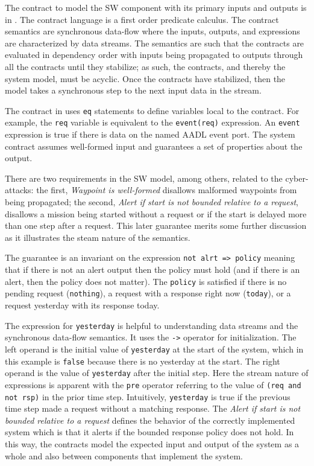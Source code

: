 The contract to model the SW component with its primary inputs and outputs is in . The contract language is a first order predicate calculus. The contract semantics are synchronous data-flow where the inputs, outputs, and expressions are characterized by data streams. The semantics are such that the contracts are evaluated in dependency order with inputs being propagated to outputs through all the contracts until they stabilize; as such, the contracts, and thereby the system model, must be acyclic. Once the contracts have stabilized, then the model takes a synchronous step to the next input data in the stream.  

The contract in  uses \texttt{eq} statements to define variables local to the contract. For example, the \texttt{req} variable is equivalent to the \texttt{event(req)} expression. An \texttt{event} expression is true if there is data on the named AADL event port. The system contract assumes well-formed input and guarantees a set of properties about the output.

There are two requirements in the SW model, among others, related to the cyber-attacks: the first, \emph{Waypoint is well-formed} disallows malformed waypoints from being propagated; the second, \emph{Alert if start is not bounded relative to a request}, disallows a mission being started without a request or if the start is delayed more than one step after a request. This later guarantee merits some further discussion as it illustrates the steam nature of the semantics.

The guarantee is an invariant on the expression \texttt{not alrt => policy} meaning that if there is not an alert output then the policy must hold (and if there is an alert, then the policy does not matter). The \texttt{policy} is satisfied if there is no pending request (\texttt{nothing}), a request with a response right now (\texttt{today}), or a request yesterday with its response today. 

The expression for \texttt{yesterday} is helpful to understanding data streams and the synchronous data-flow semantics. It uses the \texttt{->} operator for initialization. The left operand is the initial value of \texttt{yesterday} at the start of the system, which in this example is \texttt{false} because there is no yesterday at the start.  The right operand is the value of \texttt{yesterday} after the initial step. Here the stream nature of expressions is apparent with the \texttt{pre} operator referring to the value of \texttt{(req and not rsp)} in the prior time step. Intuitively, \texttt{yesterday} is true if the previous time step made a request without a matching response. The \emph{Alert if start is not bounded relative to a request} defines the behavior of the correctly implemented system which is that it alerts if the bounded response policy does not hold. In this way, the contracts model the expected input and output of the system as a whole and also between components that implement the system.

